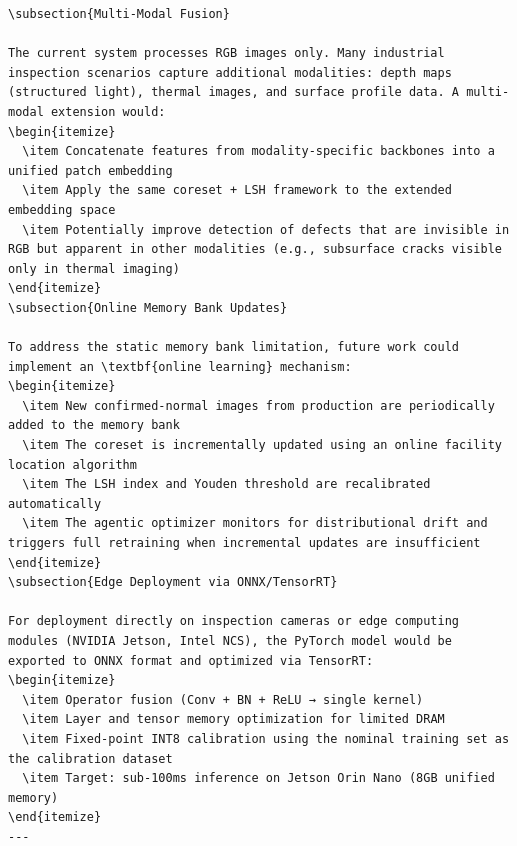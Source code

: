 \documentclass[12pt,a4paper,oneside]{report}
\begin{document}
\begin{verbatim}
\subsection{Multi-Modal Fusion}

The current system processes RGB images only. Many industrial inspection scenarios capture additional modalities: depth maps (structured light), thermal images, and surface profile data. A multi-modal extension would:
\begin{itemize}
  \item Concatenate features from modality-specific backbones into a unified patch embedding
  \item Apply the same coreset + LSH framework to the extended embedding space
  \item Potentially improve detection of defects that are invisible in RGB but apparent in other modalities (e.g., subsurface cracks visible only in thermal imaging)
\end{itemize}
\subsection{Online Memory Bank Updates}

To address the static memory bank limitation, future work could implement an \textbf{online learning} mechanism:
\begin{itemize}
  \item New confirmed-normal images from production are periodically added to the memory bank
  \item The coreset is incrementally updated using an online facility location algorithm
  \item The LSH index and Youden threshold are recalibrated automatically
  \item The agentic optimizer monitors for distributional drift and triggers full retraining when incremental updates are insufficient
\end{itemize}
\subsection{Edge Deployment via ONNX/TensorRT}

For deployment directly on inspection cameras or edge computing modules (NVIDIA Jetson, Intel NCS), the PyTorch model would be exported to ONNX format and optimized via TensorRT:
\begin{itemize}
  \item Operator fusion (Conv + BN + ReLU → single kernel)
  \item Layer and tensor memory optimization for limited DRAM
  \item Fixed-point INT8 calibration using the nominal training set as the calibration dataset
  \item Target: sub-100ms inference on Jetson Orin Nano (8GB unified memory)
\end{itemize}
---


\end{verbatim}
\end{document}
